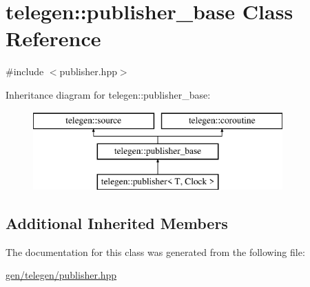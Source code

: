 \hypertarget{classtelegen_1_1publisher__base}{}\section{telegen\+:\+:publisher\+\_\+base Class Reference}
\label{classtelegen_1_1publisher__base}


{\ttfamily \#include $<$publisher.\+hpp$>$}

Inheritance diagram for telegen\+:\+:publisher\+\_\+base\+:\begin{figure}[H]
\begin{center}
\leavevmode
\includegraphics[height=3.000000cm]{classtelegen_1_1publisher__base}
\end{center}
\end{figure}
\subsection*{Additional Inherited Members}


The documentation for this class was generated from the following file\+:\begin{DoxyCompactItemize}
\item 
\hyperlink{gen_2telegen_2publisher_8hpp}{gen/telegen/publisher.\+hpp}\end{DoxyCompactItemize}
